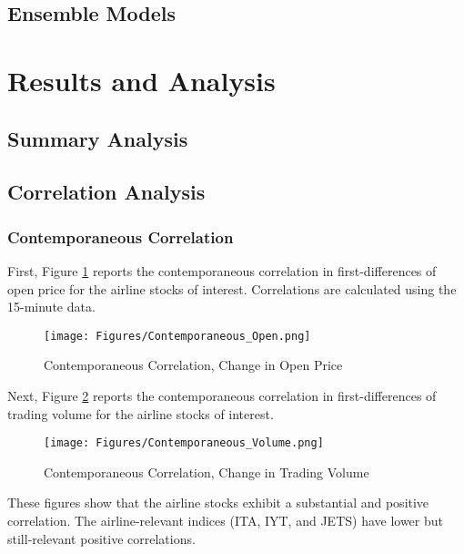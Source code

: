 \documentclass[12pt]{article}
\begin{document}
\subsection{Ensemble Models}

\section{Results and Analysis}
\subsection{Summary Analysis}
\subsection{Correlation Analysis}
\subsubsection{Contemporaneous Correlation}
First, Figure \ref{fig:contemp_open} reports the contemporaneous correlation in first-differences of open price for the airline stocks of interest. Correlations are calculated using the 15-minute data.
\begin{figure}[H]
    \centering
    \caption{Contemporaneous Correlation, Change in Open Price}
    \texttt{[image: Figures/Contemporaneous\_Open.png]}
    \label{fig:contemp_open}
\end{figure}
Next, Figure \ref{fig:contemp_vol} reports the contemporaneous correlation in first-differences of trading volume for the airline stocks of interest.
\begin{figure}[H]
    \centering
    \caption{Contemporaneous Correlation, Change in Trading Volume}
    \texttt{[image: Figures/Contemporaneous\_Volume.png]}
    \label{fig:contemp_vol}
\end{figure}
These figures show that the airline stocks exhibit a substantial and positive correlation. The airline-relevant indices (ITA, IYT, and JETS) have lower but still-relevant positive correlations. 
\end{document}
